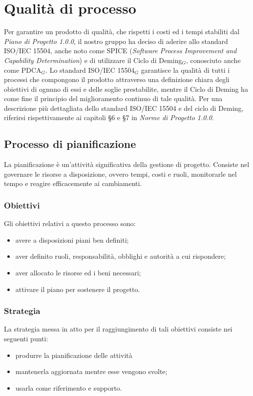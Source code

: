 \chapter{Qualità di processo}\label{QualitàDelProcesso}
Per garantire un prodotto di qualità, che rispetti i costi ed i tempi stabiliti dal \textit{Piano di Progetto 1.0.0}, il nostro gruppo ha deciso di aderire allo standard ISO/IEC 15504, anche noto come SPICE (\textit{Software Process Improvement and Capability Determination}) e di utilizzare il Ciclo di Deming$_G$, conosciuto anche come PDCA$_G$.
Lo standard ISO/IEC 15504$_G$ garantisce la qualità di tutti i processi che compongono il prodotto attraverso una definizione chiara degli obiettivi di ognuno di essi e delle soglie prestabilite, mentre  il Ciclo di Deming ha come fine  il principio del miglioramento continuo di tale qualità.
Per una descrizione più dettagliata dello standard ISO/IEC 15504 e del ciclo di Deming,
riferirsi rispettivamente ai capitoli §6 e §7 in \textit{Norme di Progetto 1.0.0}.
\section{Processo di pianificazione}\label{QualitàDelProcessoProcessoDiPianificazione}
La pianificazione è un’attività significativa della gestione di progetto. 
Consiste nel governare le risorse a disposizione, ovvero tempi, costi e ruoli, monitorarle nel tempo e reagire efficacemente ai cambiamenti. 

\subsection{Obiettivi}\label{QualitàDelProcessoProcessoDiPianificazioneObiettivi}
Gli obiettivi relativi a questo processo sono:
\begin{itemize}
	\item avere a disposizioni piani ben definiti;
	\item aver definito ruoli, responsabilità, obblighi e autorità a cui rispondere;
	\item aver allocato le risorse ed i beni necessari;
	\item attivare il piano per sostenere il progetto.
\end{itemize}

\subsection{Strategia}\label{QualitàDelProcessoProcessoDiPianificazioneStrategia}
La strategia messa in atto per il raggiungimento di tali obiettivi consiste nei seguenti punti:
\begin{itemize}
	\item produrre la pianificazione delle attività
	\item mantenerla aggiornata mentre esse vengono svolte;
	\item usarla come riferimento e supporto.
\end{itemize}

